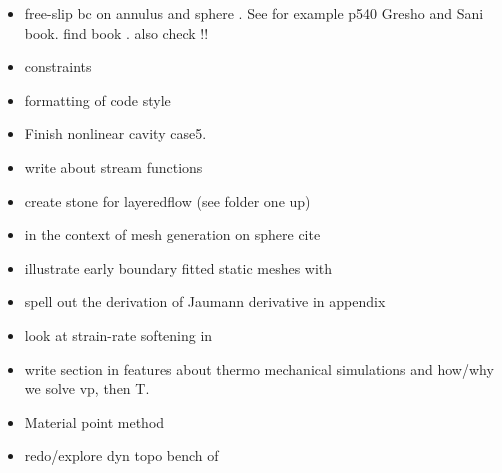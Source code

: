 \begin{itemize}
\begin{itemize}
\item free-slip bc on annulus and sphere . See for example p540 Gresho and Sani book. find book \cite{deab72}.
also check \cite{ensg82} !!
\item constraints \cite{absh79}
\item formatting of code style
\item Finish nonlinear cavity case5.
\item write about stream functions 
\item create stone for layeredflow (see folder one up)
\item in the context of mesh generation on sphere cite \cite{moma19}
\item illustrate early boundary fitted static meshes with \cite{thar85}
\item \cite{bepo10} spell out the derivation of Jaumann derivative in appendix
\item look at strain-rate softening in \cite{belz02}
\item write section in features about thermo mechanical simulations and how/why we solve vp, then T.
\item Material point method \cite{sucs94,susc96,susp07}
\item redo/explore dyn topo bench of \cite{bore19}
\end{itemize}



\end{itemize}
